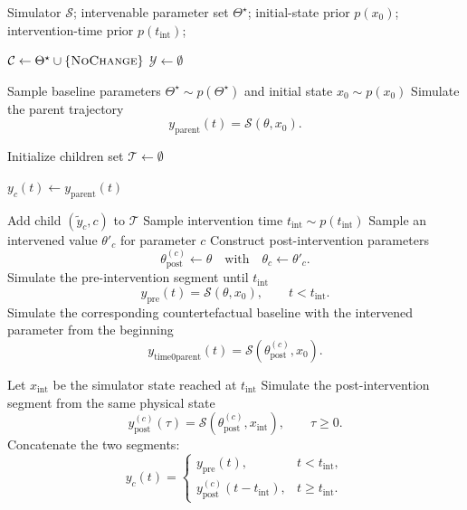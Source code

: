 \begin{algorithm}[t]
\caption{Sampling valid time series}
\label{alg:sample-children-tree}
\begin{algorithmic}[1]
\Require Simulator $\mathcal{S}$; intervenable parameter set $\Theta^\star$;
         initial-state prior $p(x_0)$;
         intervention-time prior $p(t_{\mathrm{int}})$;

\State $\mathcal{C} \gets \Theta^\star \cup \{\textsc{NoChange}\}$ 
\State $\mathcal{Y} \gets \emptyset$

    \State Sample baseline parameters $\Theta^\star \sim p(\Theta^\star)$ and initial state $x_0 \sim p(x_0)$
    \State Simulate the parent trajectory
    \[
        y_{\mathrm{parent}}(t) = \mathcal{S}(\theta, x_0).
    \]

    \State Initialize children set $\mathcal{T} \gets \emptyset$

            \State $y_c(t) \gets y_{\mathrm{parent}}(t)$

            \State Add child $(\tilde{y}_c, c)$ to $\mathcal{T}$
        \Else
            \State Sample intervention time $t_{\mathrm{int}} \sim p(t_{\mathrm{int}})$
            \State Sample an intervened value $\theta'_c$ for parameter $c$
            \State Construct post-intervention parameters
            \[
                \theta^{(c)}_{\mathrm{post}}
                \gets
                \theta
                \quad\text{with}\quad
                \theta_c \leftarrow \theta'_c .
            \]
            \State Simulate the pre-intervention segment until $t_{\mathrm{int}}$
            \[
                y_{\mathrm{pre}}(t) = \mathcal{S}(\theta, x_0),
                \qquad t < t_{\mathrm{int}} .
            \]
            \State Simulate the corresponding countertefactual baseline with the intervened parameter from the beginning
               \[
                y_{\mathrm{time0parent}}(t) = \mathcal{S}(\theta^{(c)}_{\mathrm{post}}, x_0).
            \]

            \State Let $x_{\mathrm{int}}$ be the simulator state reached at $t_{\mathrm{int}}$
            \State Simulate the post-intervention segment from the same physical state
            \[
                y^{(c)}_{\mathrm{post}}(\tau)
                =
                \mathcal{S}(\theta^{(c)}_{\mathrm{post}}, x_{\mathrm{int}}),
                \qquad \tau \geq 0 .
            \]
            \State Concatenate the two segments:
            \[
                y_c(t)
                =
                \begin{cases}
                y_{\mathrm{pre}}(t), & t < t_{\mathrm{int}},\\
                y^{(c)}_{\mathrm{post}}(t - t_{\mathrm{int}}), & t \geq t_{\mathrm{int}} .
                \end{cases}
            \]


\end{algorithmic}
\end{algorithm}
